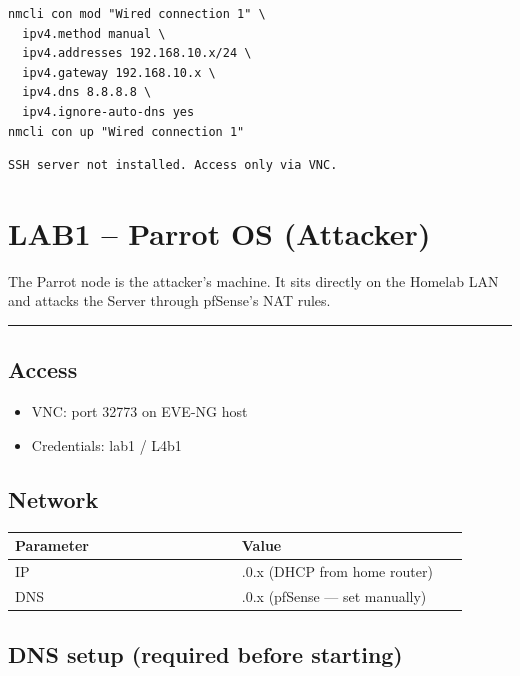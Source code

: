 \begin{lstlisting}
nmcli con mod "Wired connection 1" \
  ipv4.method manual \
  ipv4.addresses 192.168.10.x/24 \
  ipv4.gateway 192.168.10.x \
  ipv4.dns 8.8.8.8 \
  ipv4.ignore-auto-dns yes
nmcli con up "Wired connection 1"
\end{lstlisting}

\begin{lstlisting}
SSH server not installed. Access only via VNC.
\end{lstlisting}

\section{LAB1 -- Parrot OS (Attacker)}

The Parrot node is the attacker's machine. It sits directly on the Homelab LAN and attacks the Server through pfSense's NAT rules.

\begin{center}\rule{0.5\linewidth}{0.5pt}\end{center}

\subsection{Access}

\begin{itemize}
\tightlist
\item
  VNC: port 32773 on EVE-NG host
\item
  Credentials: lab1 / L4b1
\end{itemize}

\subsection{Network}

{\footnotesize\begin{longtable}[]{@{}>{\raggedright\arraybackslash}p{0.45\linewidth}
  >{\raggedright\arraybackslash}p{0.45\linewidth}@{}}
\toprule\noalign{}
Parameter & Value \\
\midrule\noalign{}
\endhead
\bottomrule\noalign{}
\endlastfoot
IP & 192.168.0.x (DHCP from home router) \\
DNS & 192.168.0.x (pfSense --- set manually) \\
\end{longtable}}

\subsection{DNS setup (required before starting)}

